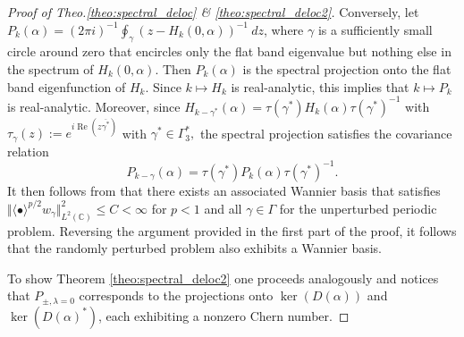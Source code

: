 \documentclass[reqno,12pt,letterpaper]{amsart}
\newcommand{\CC}{{\mathbb C}}
\numberwithin{equation}{section}
\DeclareMathOperator{\Real}{Re}
\let\Re=\Real
\begin{document}
\begin{proof}[Proof of Theo.\ref{theo:spectral_deloc} \& \ref{theo:spectral_deloc2}]
Conversely, let $P_k(\alpha)= (2\pi i)^{-1} \oint_{\gamma} (z-H_{k}(0,\alpha))^{-1} \ dz$, where $\gamma$ is a sufficiently small circle around zero that encircles only the flat band eigenvalue but nothing else in the spectrum of $H_k(0,\alpha)$. Then $P_k(\alpha)$ is the spectral projection onto the flat band eigenfunction of $H_k$. Since $k \mapsto H_k$ is real-analytic, this implies that $k \mapsto P_k$ is real-analytic. 
 Moreover, since $H_{k-\gamma^*}(\alpha) = \tau(\gamma^*) H_k(\alpha) \tau(\gamma^*)^{-1}$ with $\tau_{\gamma}(z):=e^{i\Re( z\overline{\gamma^*})}$ with $\gamma^* \in \Gamma_3^*,$ the spectral projection satisfies the covariance relation
 \[P_{k-\gamma}(\alpha) = \tau(\gamma^*) P_k(\alpha) \tau(\gamma^*)^{-1}. \]
 It then follows from \cite[Theo. $2.4$]{MPPT} that there exists an associated Wannier basis that satisfies $\Vert \langle \bullet \rangle^{p/2} w_{\gamma} \Vert^2_{L^2(\CC)}\le C <\infty$ for $p<1$ and all $\gamma \in \Gamma$ for the unperturbed periodic problem. Reversing the argument provided in the first part of the proof, it follows that the randomly perturbed problem also exhibits a Wannier basis. 
 
To show Theorem \ref{theo:spectral_deloc2} one proceeds analogously and notices that $P_{\pm,\lambda=0}$ corresponds to the projections onto $\ker(D(\alpha))$ and $\ker(D(\alpha)^*)$, each exhibiting a nonzero Chern number. 
\end{proof}
\end{document}

